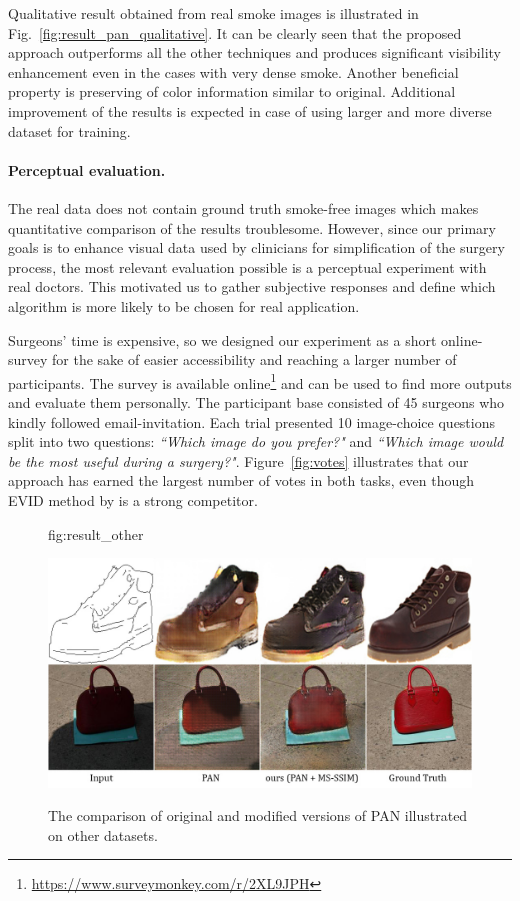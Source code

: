 \documentclass[pmlr]{jmlr}
\begin{document}
Qualitative result obtained from real smoke images is illustrated in Fig.~\ref{fig:result_pan_qualitative}. It can be clearly seen that the proposed approach outperforms all the other techniques and produces significant visibility enhancement even in the cases with very dense smoke. Another beneficial property is preserving of color information similar to original. Additional improvement of the results is expected in case of using larger and more diverse dataset for training. 

\paragraph{Perceptual evaluation.} The real data does not contain ground truth smoke-free images which makes quantitative comparison of the results troublesome. However, since our primary goals is to enhance visual data used by clinicians for simplification of the surgery process, the most relevant evaluation possible is a perceptual experiment with real doctors. This motivated us to gather subjective responses and define which algorithm is more likely to be chosen for real application.

Surgeons' time is expensive, so we designed our experiment as a short online-survey for the sake of easier accessibility and reaching a larger number of participants. The survey is available online\footnote{ \url{https://www.surveymonkey.com/r/2XL9JPH}} and can be used to find more outputs and evaluate them personally. The participant base consisted of 45 surgeons who kindly followed email-invitation. Each trial presented 10 image-choice questions split into two questions: \emph{``Which image do you prefer?"} and \emph{``Which image would be the most useful during a surgery?"}.  Figure~\ref{fig:votes} illustrates that our approach has earned the largest number of votes in both tasks, even though  EVID method by \citep{galdran2015enhanced} is a strong competitor.

\begin{figure}[t!]
\floatconts
{fig:result_other}
{\caption{The comparison of original and modified versions of PAN illustrated on other datasets.}}
{\includegraphics[width=1\linewidth]{fig5}}
\end{figure}
\end{document}
